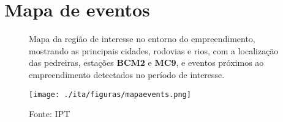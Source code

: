 
    \newpage
    \section{Mapa de eventos}
    \begin{figure}[ht!]
    \centering
    \captionsetup{justification=justified, singlelinecheck=false, width=1\textwidth}
    \caption{Mapa da região de interesse no entorno do empreendimento, mostrando as principais cidades, rodovias e rios, com a localização das pedreiras, estações \textbf{BCM2} e \textbf{MC9}, e eventos próximos ao empreendimento detectados no período de interesse.}
    \begin{mdframed}[
        linecolor=black,
        linewidth=1pt,
        roundcorner=10pt,
    ]
    \begin{center}
    \texttt{[image: ./ita/figuras/mapaevents.png]}
    \end{center}
    \end{mdframed}
    \caption*{Fonte: IPT}
    \end{figure}
    \newpage
    

